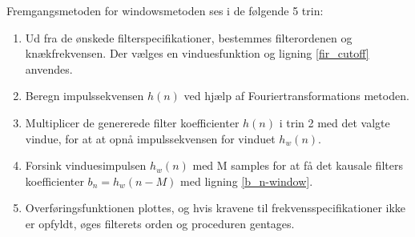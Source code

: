 Fremgangsmetoden for windowsmetoden ses i de følgende 5 trin:
\begin{enumerate}
	\item Ud fra de ønskede filterspecifikationer, bestemmes filterordenen og knækfrekvensen. Der vælges en vinduesfunktion og ligning \ref{fir_cutoff} anvendes.
	\item Beregn impulssekvensen $h(n)$ ved hjælp af Fouriertransformations metoden.
	\item Multiplicer de genererede filter koefficienter $h(n)$ i trin 2 med det valgte vindue, for at at opnå impulssekvensen for vinduet $h_w(n)$.
	\item Forsink vinduesimpulsen $h_w(n)$ med M samples for at få det kausale filters koefficienter $b_n = h_w(n-M)$ med ligning \ref{b_n-window}.
	\item Overføringsfunktionen plottes, og hvis kravene til frekvensspecifikationer ikke er opfyldt, øges filterets orden og proceduren gentages.
\end{enumerate}